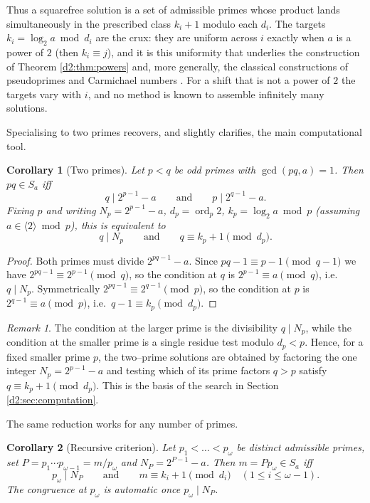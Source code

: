 \documentclass[a4paper]{article}
\theoremstyle{plain}
\newtheorem{corollary}{Corollary}[subsection]
\theoremstyle{definition}
\theoremstyle{remark}
\newtheorem{remark}{Remark}[subsection]
\newcommand{\ord}{\operatorname{ord}}
\newcommand{\dvd}{\mid}
\newcommand{\Sa}{S_a}
\begin{document}
Thus a squarefree solution is a set of admissible primes whose product lands simultaneously in the prescribed class $k_i+1$ modulo each $d_i$. The targets $k_i=\log_2a\bmod d_i$ are the crux: they are uniform across $i$ exactly when $a$ is a power of $2$ (then $k_i\equiv j$), and it is this uniformity that underlies the construction of Theorem \ref{d2:thm:powers} and, more generally, the classical constructions of pseudoprimes and Carmichael numbers \cite{d2:cipolla,d2:agp}. For a shift that is not a power of $2$ the targets vary with $i$, and no method is known to assemble infinitely many solutions.

Specialising to two primes recovers, and slightly clarifies, the main computational tool.

\begin{corollary}[Two primes]\label{d2:cor:twoprime}
Let $p<q$ be odd primes with $\gcd(pq,a)=1$. Then $pq\in\Sa$ iff
\[
q\dvd 2^{p-1}-a\qquad\text{and}\qquad p\dvd 2^{q-1}-a.
\]
Fixing $p$ and writing $N_p=2^{p-1}-a$, $d_p=\ord_p2$, $k_p=\log_2a\bmod p$ (assuming $a\in\langle2\rangle\bmod p$), this is equivalent to
\[
q\dvd N_p\qquad\text{and}\qquad q\equiv k_p+1\pmod{d_p}.
\]
\end{corollary}

\begin{proof}
Both primes must divide $2^{pq-1}-a$. Since $pq-1\equiv p-1\pmod{q-1}$ we have $2^{pq-1}\equiv2^{p-1}\pmod q$, so the condition at $q$ is $2^{p-1}\equiv a\pmod q$, i.e.\ $q\dvd N_p$. Symmetrically $2^{pq-1}\equiv2^{q-1}\pmod p$, so the condition at $p$ is $2^{q-1}\equiv a\pmod p$, i.e.\ $q-1\equiv k_p\pmod{d_p}$.
\end{proof}

\begin{remark}\label{d2:rem:onesided}
The condition at the larger prime is the divisibility $q\dvd N_p$, while the condition at the smaller prime is a single residue test modulo $d_p<p$. Hence, for a fixed smaller prime $p$, the two--prime solutions are obtained by factoring the one integer $N_p=2^{p-1}-a$ and testing which of its prime factors $q>p$ satisfy $q\equiv k_p+1\pmod{d_p}$. This is the basis of the search in Section \ref{d2:sec:computation}.
\end{remark}

The same reduction works for any number of primes.

\begin{corollary}[Recursive criterion]\label{d2:cor:recursive}
Let $p_1<\dots<p_\omega$ be distinct admissible primes, set $P=p_1\cdots p_{\omega-1}=m/p_\omega$ and $N_P=2^{P-1}-a$. Then $m=Pp_\omega\in\Sa$ iff
\[
p_\omega\dvd N_P\qquad\text{and}\qquad m\equiv k_i+1\pmod{d_i}\quad(1\le i\le\omega-1).
\]
The congruence at $p_\omega$ is automatic once $p_\omega\dvd N_P$.
\end{corollary}
\end{document}
